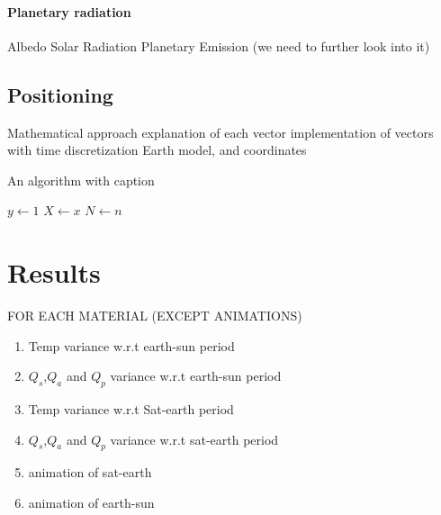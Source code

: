 \documentclass[11pt]{article}
\begin{document}
\paragraph{Planetary radiation} 



































Albedo
Solar Radiation
Planetary
Emission (we need to further look into it)

\subsection{Positioning} %
Mathematical approach
explanation of each vector
implementation of vectors with time
discretization 
Earth model, and coordinates


{}

\begin{algorithm}[hbt!]
\caption{An algorithm with caption}\label{alg:two}
$y \gets 1$\;
$X \gets x$\;
$N \gets n$\;
\end{algorithm}



\newpage
\section{Results} %
\indent
FOR EACH MATERIAL (EXCEPT ANIMATIONS)
\begin{enumerate}
    \item Temp variance w.r.t earth-sun period
    \item $Q_{s}$,$Q_{a}$ and $Q_{p}$ variance w.r.t earth-sun period
    \item Temp variance w.r.t Sat-earth period
    \item $Q_{s}$,$Q_{a}$ and $Q_{p}$ variance w.r.t sat-earth period
    \item animation of sat-earth
    \item animation of earth-sun 


\end{enumerate}
\end{document}
